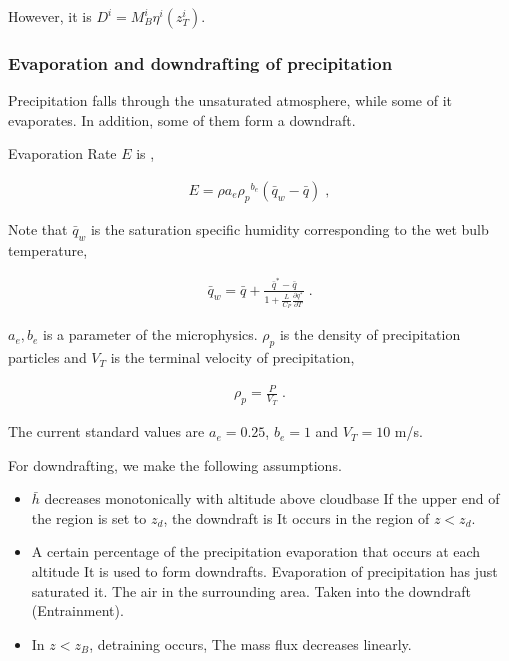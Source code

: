 However, it is \(D^i = M_B^i \eta^i(z_T^i)\).

\hypertarget{evaporation-and-downdrafting-of-precipitation}{%
\subsubsection{Evaporation and downdrafting of
precipitation}\label{evaporation-and-downdrafting-of-precipitation}}

Precipitation falls through the unsaturated atmosphere, while some of it
evaporates. In addition, some of them form a downdraft.

Evaporation Rate \(E\) is ,

\begin{eqnarray}
 E = \rho a_e {\rho_p}^{b_e} \left( \bar{q}_{w} - \bar{q} \right) \; ,
\end{eqnarray}

Note that \(\bar{q}_{w}\) is the saturation specific humidity
corresponding to the wet bulb temperature,

\begin{eqnarray}
  \bar{q}_w = \bar{q} 
            + \frac{\bar{q}^* - \bar{q}}{1+ \frac{L}{C_P}\frac{\partial q^*}{\partial T}} \; .
\end{eqnarray}

\(a_e, b_e\) is a parameter of the microphysics. \(\rho_p\) is the
density of precipitation particles and \(V_T\) is the terminal velocity
of precipitation,

\begin{eqnarray}
  \rho_p = \frac{P}{V_T} \; .
\end{eqnarray}

The current standard values are \(a_e=0.25\), \(b_e=1\) and \(V_T=10\)
m/s.

For downdrafting, we make the following assumptions.

\begin{itemize}
\item
  \(\bar{h}\) decreases monotonically with altitude above cloudbase If
  the upper end of the region is set to \(z_d\), the downdraft is It
  occurs in the region of \(z < z_d\).
\item
  A certain percentage of the precipitation evaporation that occurs at
  each altitude It is used to form downdrafts. Evaporation of
  precipitation has just saturated it. The air in the surrounding area.
  Taken into the downdraft (Entrainment).
\item
  In \(z < z_B\), detraining occurs, The mass flux decreases linearly.
\end{itemize}

